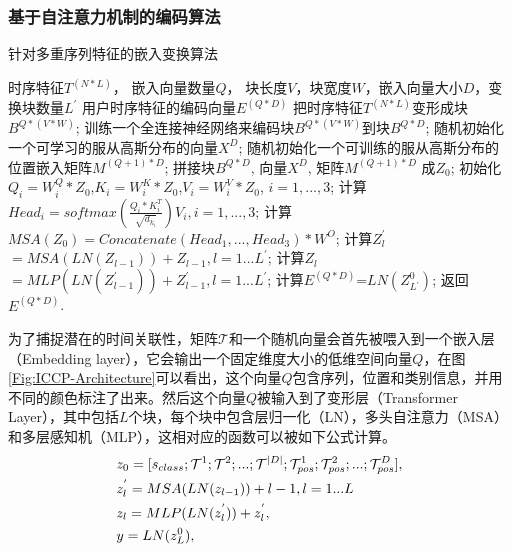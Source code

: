 \subsubsection{基于自注意力机制的编码算法}
\begin{algorithm}
	\caption{针对多重序列特征的嵌入变换算法}
	\label{ALG:Transformer-Encoding}
	\renewcommand{\algorithmicrequire}{\textbf{Input:}}
	\renewcommand{\algorithmicensure}{\textbf{Output:}}
	
	\begin{algorithmic}[1]
		\REQUIRE 时序特征$T^{(N*L)}$， 嵌入向量数量$Q$， 块长度$V$，块宽度$W$，嵌入向量大小$D$，变换块数量$L^\prime$
		\ENSURE 用户时序特征的编码向量$E^{(Q*D)}$
		\STATE 把时序特征$T^{(N*L)}$变形成块$B^{Q*(V*W)}$;
		\STATE 训练一个全连接神经网络来编码块$B^{Q*(V*W)}$到块$B^{Q*D}$;
		\STATE 随机初始化一个可学习的服从高斯分布的向量$X^D$;   %
		\STATE 随机初始化一个可训练的服从高斯分布的位置嵌入矩阵$M^{(Q+1)*D}$; %
		\STATE 拼接块$B^{Q*D}$, 向量$X^D$, 矩阵$M^{(Q+1)*D}$ 成$Z_0$;  %
		\STATE 初始化$Q_i=W^Q_i*Z_0$,$K_i=W^K_i*Z_0$,$V_i=W^V_i*Z_0$, $i=1,...,3$;
		\STATE 计算$Head_i=softmax(\frac{Q_i*K^T_i}{\sqrt{d_{k_i}}})V_i,i=1,...,3$;
		\STATE 计算$MSA(Z_0)=Concatenate(Head_1,...,Head_3)*W^O$;
		\STATE 计算$Z^\prime_l$ $=MSA(LN(Z_{l-1}))+Z_{l-1},l=1...L^\prime$;
		\STATE 计算$Z_l$ $=MLP(LN(Z_{l-1}^\prime))+Z_{l-1}^\prime,l=1...L^\prime$;
		\STATE 计算$E^{(Q*D)}$=$LN(Z^0_{L{^\prime}})$;
		\STATE 返回$E^{(Q*D)}$.		
		
	\end{algorithmic}
\end{algorithm}
为了捕捉潜在的时间关联性，矩阵$\mathcal{T}$和一个随机向量会首先被喂入到一个嵌入层（Embedding layer），它会输出一个固定维度大小的低维空间向量$Q$，在图\ref{Fig:ICCP-Architecture}可以看出，这个向量$Q$包含序列，位置和类别信息，并用不同的颜色标注了出来。然后这个向量$Q$被输入到了变形层（Transformer Layer），其中包括$L$个块，每个块中包含层归一化（LN），多头自注意力（MSA）和多层感知机（MLP），这相对应的函数可以被如下公式计算。
\begin{subequations}\label{Eq.(3-4)}
	\renewcommand{\theequation}{\theparentequation-\alph{equation}} %
	\begin{align}
		&z_{0} = [s_{class}; \mathcal{T}^{1}; \mathcal{T}^{2}; ... ; \mathcal{T}^{\lvert D \rvert}; \mathcal{T}^{1}_{pos}; \mathcal{T}^{2}_{pos}; ...; \mathcal{T}^{D}_{pos} ], \label{Eq.(a)} \\
		&z_{l}^{'} = MSA(LN(z_{l-1})) + l-1, l=1...L \label{Eq.(b)} \\
		&z_{l} = MLP(LN(z_{l}^{'}))+z_{l}^{'}, \label{Eq.(c)} \\
		&y = LN(z_{L}^{0}), \label{Eq.(d)} 
	\end{align}
	\label{Eq:Transformer}
\end{subequations}
